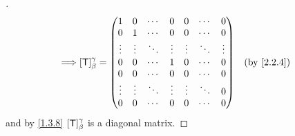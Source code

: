 \begin{proof}[]
\begin{align*}
		\implies & [\T]_{\beta}^{\gamma} = \begin{pmatrix}
			                                   1      & 0      & \cdots & 0      & 0      & \cdots & 0      \\
			                                   0      & 1      & \cdots & 0      & 0      & \cdots & 0      \\
			                                   \vdots & \vdots & \ddots & \vdots & \vdots & \ddots & \vdots \\
			                                   0      & 0      & \cdots & 1      & 0      & \cdots & 0      \\
			                                   0      & 0      & \cdots & 0      & 0      & \cdots & 0      \\
			                                   \vdots & \vdots & \ddots & \vdots & \vdots & \ddots & 0      \\
			                                   0      & 0      & \cdots & 0      & 0      & \cdots & 0
		                                   \end{pmatrix} &  & \by{2.2.4}
	\end{align*}
	and by \cref{1.3.8} \([\mathsf{T}]_{\beta}^{\gamma}\) is a diagonal matrix.
\end{proof}
